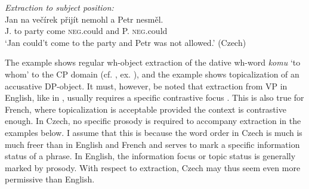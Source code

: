 \documentclass[output=paper,colorlinks,citecolor=brown,
modfonts
]{langscibook}
\begin{document}
\begin{exe}
\ex \label{23}\textit{Extraction to subject position:}\smallskip\\
\gll Jan na večírek přijít  nemohl a Petr nesměl.\\
J.    to  party    come \textsc{neg}.could  and P.    \textsc{neg}.could\\
\glt `Jan could't come to the party and Petr was not allowed.' \hfill (Czech)
\end{exe} 

\noindent The example  shows regular wh-object extraction of the dative wh-word \textit{komu} `to whom' to the CP domain (cf. , ex. ), and the example  shows topicalization of an accusative DP-object. It must, however, be noted that extraction from VP in English, like in , usually requires a specific contrastive focus \citep{Schuyler2001,Lasnik2001,Merchant2008b}. This is also true for French, where topicalization is acceptable provided the context is contrastive enough. In Czech, no specific prosody is required to accompany extraction in the examples below. I assume that this is because the word order in Czech is much is much freer than in English and French and serves to mark a specific information status of a phrase. In English, the information focus or topic status is generally marked by prosody. With respect to extraction, Czech may thus seem even more permissive than English. 
\end{document}
